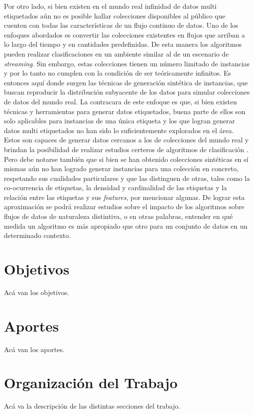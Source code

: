 Por otro lado, si bien existen en el mundo real infinidad de datos multi
etiquetados aún no es posible hallar colecciones disponibles al público que
cuenten con todas las características de un flujo continuo de datos. Uno de los
enfoques abordados es convertir las colecciones existentes en flujos que arriban
a lo largo del tiempo y en cantidades predefinidas. De esta manera los
algoritmos pueden realizar clasificaciones en un ambiente similar al de un
escenario de \textit{streaming}. Sin embargo, estas colecciones tienen un número
limitado de instancias y por lo tanto no cumplen con la condición de ser
teóricamente infinitos. Es entonces aquí donde surgen las técnicas de generación
sintética de instancias, que buscan reproducir la distribución subyacente de los
datos para simular colecciones de datos del mundo real. La contracara de este
enfoque es que, si bien existen técnicas y herramientas para generar datos
etiquetados, buena parte de ellos son solo aplicables para instancias de una
única etiqueta y los que logran generar datos multi etiquetados no han sido lo
suficientemente explorados en el área. Estos son capaces de generar datos
cercanos a los de colecciones del mundo real \cite{read_generating_nodate} y
brindan la posibilidad de realizar estudios certeros de algoritmos de
clasificación \cite{read_scalable_2012}. Pero debe notarse también que si bien
se han obtenido colecciones sintéticas en sí mismas aún no han logrado generar
instancias para una colección en concreto, respetando sus cualidades
particulares y que las distinguen de otras, tales como la co-ocurrencia de
etiquetas, la densidad y cardinalidad de las etiquetas y la relación entre las
etiquetas y sus \textit{features}, por mencionar algunas. De lograr esta
aproximación se podrá realizar estudios sobre el impacto de los algoritmos sobre
flujos de datos de naturaleza distintiva, o en otras palabras, entender en qué
medida un algoritmo es más apropiado que otro para un conjunto de datos en un
determinado contexto. 






\section{Objetivos} Acá van los objetivos.

\section{Aportes} Acá van los aportes.

\section{Organización del Trabajo} Acá va la descripción de las distintas
secciones del trabajo.
